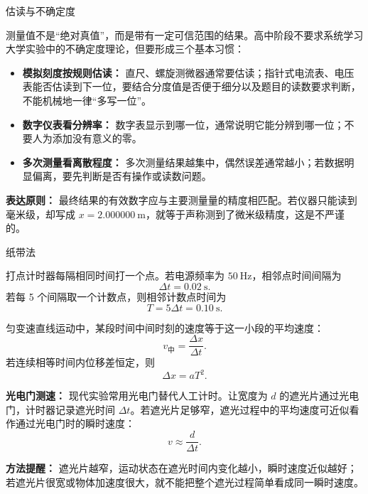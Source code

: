 \begin{conceptbox}{估读与不确定度}

测量值不是“绝对真值”，而是带有一定可信范围的结果。高中阶段不要求系统学习大学实验中的不确定度理论，但要形成三个基本习惯：

\begin{center}


\label{fig:measurement-uncertainty}
\end{center}

\begin{itemize}
  \item \textbf{模拟刻度按规则估读：} 直尺、螺旋测微器通常要估读；指针式电流表、电压表能否估读到下一位，要结合分度值是否便于细分以及题目的读数要求判断，不能机械地一律“多写一位”。
  \item \textbf{数字仪表看分辨率：} 数字表显示到哪一位，通常说明它能分辨到哪一位；不要人为添加没有意义的零。
  \item \textbf{多次测量看离散程度：} 多次测量结果越集中，偶然误差通常越小；若数据明显偏离，要先判断是否有操作或读数问题。
\end{itemize}

\textbf{表达原则：} 最终结果的有效数字应与主要测量量的精度相匹配。若仪器只能读到毫米级，却写成 $x=2.000000\ \mathrm{m}$，就等于声称测到了微米级精度，这是不严谨的。

\end{conceptbox}

\begin{conceptbox}{纸带法}

打点计时器每隔相同时间打一个点。若电源频率为 $50\ \mathrm{Hz}$，相邻点时间间隔为
\[
\Delta t=0.02\ \mathrm{s}.
\]
若每 5 个间隔取一个计数点，则相邻计数点时间为
\[
T=5\Delta t=0.10\ \mathrm{s}.
\]

\begin{center}


\label{fig:ticker-tape-analysis}
\end{center}

匀变速直线运动中，某段时间中间时刻的速度等于这一小段的平均速度：
\[
v_{\text{中}}=\frac{\Delta x}{\Delta t}.
\]
若连续相等时间内位移差恒定，则
\[
\Delta x=aT^2.
\]

\textbf{光电门测速：} 现代实验常用光电门替代人工计时。让宽度为 $d$ 的遮光片通过光电门，计时器记录遮光时间 $\Delta t$。若遮光片足够窄，遮光过程中的平均速度可近似看作通过光电门时的瞬时速度：
\[
v\approx\frac{d}{\Delta t}.
\]

\begin{center}


\label{fig:photogate-speed}
\end{center}

\textbf{方法提醒：} 遮光片越窄，运动状态在遮光时间内变化越小，瞬时速度近似越好；若遮光片很宽或物体加速度很大，就不能把整个遮光过程简单看成同一瞬时速度。
\end{conceptbox}

